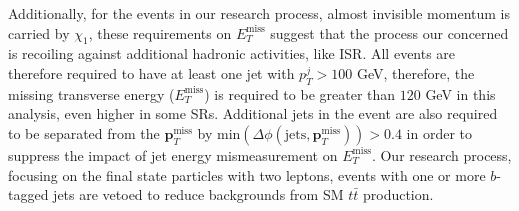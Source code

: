 \documentclass[preprint, superscriptaddress,amsmath, nofootinbib]{revtex4-1}
\begin{document}
Additionally, for the events in our research process, almost invisible momentum is carried by $\chi_{1}$, these requirements on $E_T^\mathrm{miss}$ suggest that the process our concerned is recoiling against additional hadronic activities, like ISR. All events are therefore required to have at least one jet with $p^j_{T}>100$ GeV, therefore, the missing transverse energy ($E_T^\mathrm{miss}$) is required to be greater than $120$ GeV in this analysis, even higher in some SRs. Additional jets in the event are also required to be separated from the $\mathbf{p}_{T}^\mathrm{miss}$ by $\text{min}(\Delta\phi(\text{jets}, \mathbf{p}_T^\mathrm{miss}))>0.4$ in order to suppress the impact of jet energy mismeasurement on $E_T^\mathrm{miss}$. 
Our research process, focusing on the final state particles with two leptons, events with one or more $b$-tagged jets are vetoed to reduce backgrounds from SM $t\bar{t}$ production. %
\end{document}
